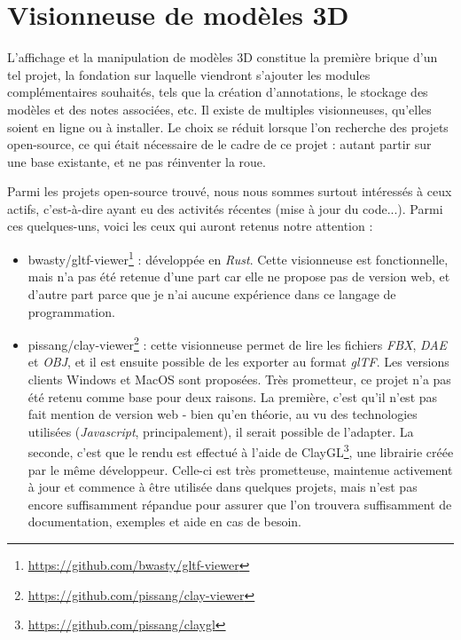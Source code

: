 \section{Visionneuse de modèles 3D}

L'affichage et la manipulation de modèles 3D constitue la première brique d'un tel projet, la fondation sur laquelle viendront s'ajouter les modules complémentaires souhaités, tels que la création d'annotations, le stockage des modèles et des notes associées, etc.
Il existe de multiples visionneuses, qu'elles soient en ligne ou à installer. Le choix se réduit lorsque l'on recherche des projets open-source, ce qui était nécessaire de le cadre de ce projet : autant partir sur une base existante, et ne pas réinventer la roue.


Parmi les projets open-source trouvé, nous nous sommes surtout intéressés à ceux actifs, c'est-à-dire ayant eu des activités récentes (mise à jour du code...). Parmi ces quelques-uns, voici les ceux qui auront retenus notre attention :

\begin{itemize}
    \item bwasty/gltf-viewer\footnote{\url{https://github.com/bwasty/gltf-viewer}} : développée en \textit{Rust}. Cette visionneuse est fonctionnelle, mais n'a pas été retenue d'une part car elle ne propose pas de version web, et d'autre part parce que je n'ai aucune expérience dans ce langage de programmation.
    \item pissang/clay-viewer\footnote{\url{https://github.com/pissang/clay-viewer}} : cette visionneuse permet de lire les fichiers \textit{FBX}, \textit{DAE} et \textit{OBJ}, et il est ensuite possible de les exporter au format \textit{glTF}. Les versions clients Windows et MacOS sont proposées. Très prometteur, ce projet n'a pas été retenu comme base pour deux raisons. La première, c'est qu'il n'est pas fait mention de version web - bien qu'en théorie, au vu des technologies utilisées (\textit{Javascript}, principalement), il serait possible de l'adapter. La seconde, c'est que le rendu est effectué à l'aide de ClayGL\footnote{\url{https://github.com/pissang/claygl}}, une librairie créée par le même développeur. Celle-ci est très prometteuse, maintenue activement à jour et commence à être utilisée dans quelques projets, mais n'est pas encore suffisamment répandue pour assurer que l'on trouvera suffisamment de documentation, exemples et aide en cas de besoin.
\end{itemize}


